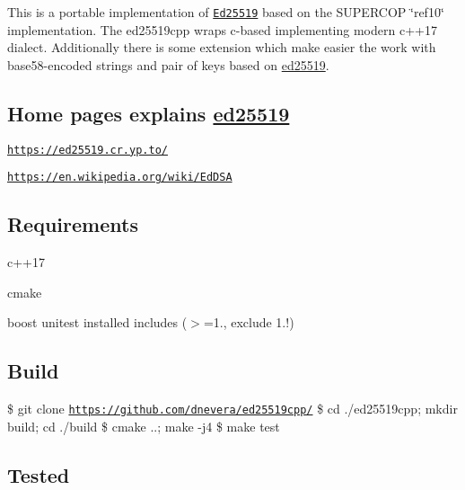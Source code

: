 This is a portable implementation of \href{http://ed25519.cr.yp.to/}{\tt Ed25519} based on the S\+U\+P\+E\+R\+C\+OP \char`\"{}ref10\char`\"{} implementation. The ed25519cpp wraps c-\/based implementing modern c++17 dialect. Additionally there is some extension which make easier the work with base58-\/encoded strings and pair of keys based on \mbox{\hyperlink{namespaceed25519}{ed25519}}.

\subsection*{Home pages explains \mbox{\hyperlink{namespaceed25519}{ed25519}}}


\begin{DoxyEnumerate}
\item \href{https://ed25519.cr.yp.to/}{\tt https\+://ed25519.\+cr.\+yp.\+to/}
\end{DoxyEnumerate}
\begin{DoxyEnumerate}
\item \href{https://en.wikipedia.org/wiki/EdDSA}{\tt https\+://en.\+wikipedia.\+org/wiki/\+Ed\+D\+SA}
\end{DoxyEnumerate}

\subsection*{Requirements}


\begin{DoxyEnumerate}
\item c++17
\end{DoxyEnumerate}
\begin{DoxyEnumerate}
\item cmake
\end{DoxyEnumerate}
\begin{DoxyEnumerate}
\item boost unitest installed includes ($>$=1., exclude 1.!)
\end{DoxyEnumerate}

\subsection*{Build}

\$ git clone \href{https://github.com/dnevera/ed25519cpp/}{\tt https\+://github.\+com/dnevera/ed25519cpp/} \$ cd ./ed25519cpp; mkdir build; cd ./build \$ cmake ..; make -\/j4 \$ make test

\subsection*{Tested}


